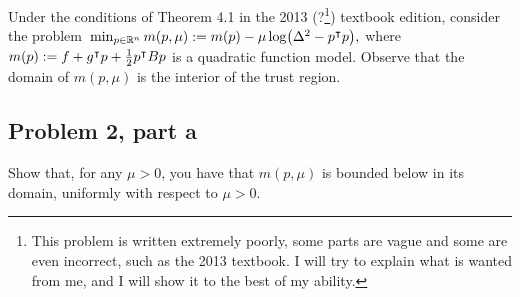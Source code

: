 \jump
Under the conditions of Theorem 4.1 in the 2013 (?\footnote{This problem is written extremely poorly, some parts are vague and some are even incorrect, such as the 2013 textbook. I will try to explain what is wanted from me, and I will show it to the best of my ability. }) textbook edition, consider the problem $ \\ \min_{p \in \mathbb{R}^n} m(p, \mu) := m(p) - \mu \log (\Delta^2 - p^\intercal p),$ where $m(p) := f + g^\intercal p + \frac{1}{2}p^\intercal Bp$ is a quadratic function model. Observe that the domain of $m(p, \mu)$ is the interior of the trust region.
\subsection{Problem 2, part a}
Show that, for any $\mu > 0$, you have that $m(p, \mu)$ is bounded below in its domain, uniformly with respect to $\mu > 0$.

